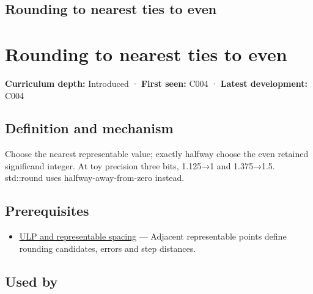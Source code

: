 \hypertarget{appendix-614afe1de592}{}
\section*{Rounding to nearest ties to even}
\chapter{Rounding to nearest ties to even}\label{appendix-614afe1de592-rounding-to-nearest-ties-to-even}

\textbf{Curriculum depth:} Introduced · \textbf{First seen:} C004 · \textbf{Latest development:} C004

\section{Definition and mechanism}\label{appendix-614afe1de592-definition-and-mechanism}

Choose the nearest representable value; exactly halfway choose the even retained significand integer. At toy precision three bits, 1.125→1 and 1.375→1.5. std::round uses halfway-away-from-zero instead.

\section{Prerequisites}\label{appendix-614afe1de592-prerequisites}

\begin{itemize}
\tightlist
\item
  \hyperref[appendix-14bab4cab9d4]{ULP and representable spacing} --- Adjacent representable points define rounding candidates, errors and step distances.
\end{itemize}

\section{Used by}\label{appendix-614afe1de592-used-by}

